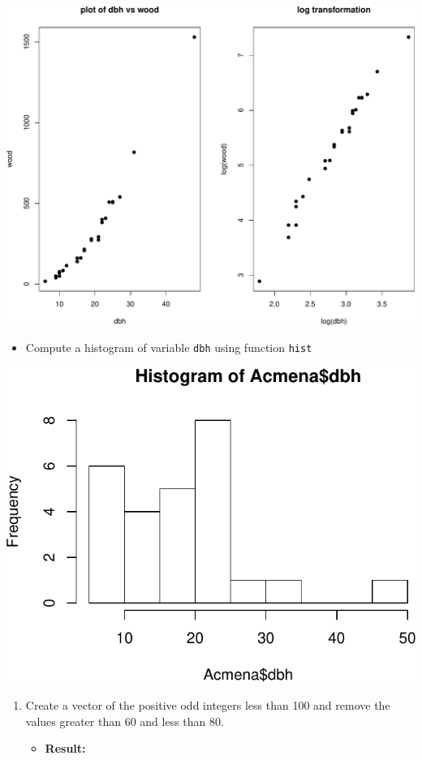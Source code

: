 \documentclass[]{article}
\def\tightlist{}
\numberwithin{equation}{section}
\begin{document}
\includegraphics{index_files/figure-latex/unnamed-chunk-70-1.pdf}

\begin{itemize}
\tightlist
\item
  Compute a histogram of variable \texttt{dbh} using function
  \texttt{hist}
\end{itemize}

\includegraphics{index_files/figure-latex/unnamed-chunk-71-1.pdf}

\begin{enumerate}
\def\labelenumi{\arabic{enumi}.}
\setcounter{enumi}{3}
\item
  Create a vector of the positive odd integers less than 100 and remove
  the values greater than 60 and less than 80.

  \begin{itemize}
  \tightlist
  \item
    \textbf{Result:}
  \end{itemize}
\end{enumerate}
\end{document}
